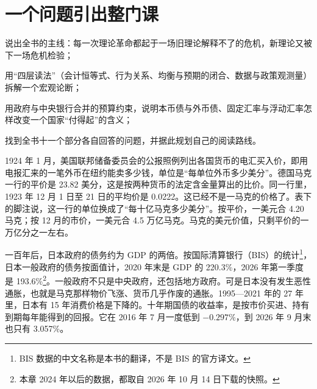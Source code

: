 \chapter{一个问题引出整门课}\label{ch:intro}

\begin{chapterguide}
\begin{guidegoals}
\item 说出全书的主线：每一次理论革命都起于一场旧理论解释不了的危机，新理论又被下一场危机检验；
\item 用“四层读法”（会计恒等式、行为关系、均衡与预期的闭合、数据与政策观测量）拆解一个宏观论断；
\item 用政府与中央银行合并的预算约束，说明本币债与外币债、固定汇率与浮动汇率怎样改变一个国家“付得起”的含义；
\item 找到全书十一个部分各自回答的问题，并据此规划自己的阅读路线。
\end{guidegoals}
\end{chapterguide}

1924 年 1 月，美国联邦储备委员会的公报照例列出各国货币的电汇买入价，即用电报汇来的一笔外币在纽约能卖多少钱，单位是“每单位外币多少美分”。德国马克一行的平价是 23.82 美分，这是按两种货币的法定含金量算出的比价。同一行里，1923 年 12 月 1 日至 21 日的平均价是 0.0222。这已经不是一马克的价格了。表下的脚注说，这一行的单位换成了“每十亿马克多少美分”\cite{frb1924}。按平价，一美元合 4.20 马克；按 12 月的市价，一美元合 4.5 万亿马克。马克的美元价值，只剩平价的一万亿分之一左右。

一百年后，日本政府的债务约为 GDP 的两倍。按国际清算银行（BIS）的统计\footnote{BIS 数据的中文名称是本书的翻译，不是 BIS 的官方译文。}，日本一般政府的债务按面值计，2020 年末是 GDP 的 220.3\%，2026 年第一季度是 193.6\%\cite{bis2026}\footnote{本章 2024 年以后的数据，都取自 2026 年 10 月 14 日下载的快照。}。一般政府不只是中央政府，还包括地方政府。可是日本没有发生恶性通胀，也就是马克那样物价飞涨、货币几乎作废的通胀。1995—2021 年的 27 年里，日本有 15 年消费价格是下降的\cite{wdi2026}。十年期国债的收益率，是按市价买进、持有到期每年能得到的回报。它在 2016 年 7 月一度低到 $-0.297\%$，到 2026 年 9 月末也只有 3.057\%\cite{mof2026}。

